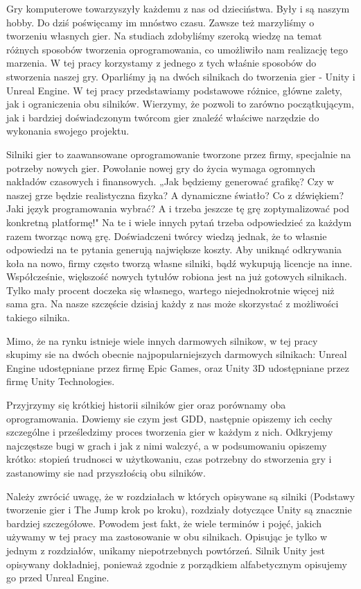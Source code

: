 \documentclass[openright]{xmgr}
\begin{document}
Gry komputerowe towarzyszyły każdemu z nas od dzieciństwa. Były i są naszym hobby. Do dziś poświęcamy im mnóstwo czasu. Zawsze też marzyliśmy o tworzeniu własnych gier. Na studiach zdobyliśmy szeroką wiedzę na temat różnych sposobów tworzenia oprogramowania, co umożliwiło nam realizację tego marzenia. W tej pracy korzystamy z jednego z tych właśnie sposobów do stworzenia naszej gry. Oparliśmy ją na dwóch silnikach do tworzenia gier - Unity i Unreal Engine. W tej pracy przedstawiamy podstawowe różnice, główne zalety, jak i ograniczenia obu silników. Wierzymy, że pozwoli to zarówno początkującym, jak i bardziej doświadczonym twórcom gier znaleźć właściwe narzędzie do wykonania swojego projektu.

Silniki gier to zaawansowane oprogramowanie tworzone przez firmy, specjalnie na potrzeby nowych gier. Powołanie nowej gry do życia wymaga ogromnych nakładów czasowych i finansowych. „Jak będziemy generować grafikę? Czy w naszej grze będzie realistyczna fizyka? A dynamiczne światło? Co z dźwiękiem? Jaki język programowania wybrać? A i trzeba jeszcze tę grę zoptymalizować pod konkretną platformę!" Na te i wiele innych pytań trzeba odpowiedzieć za każdym razem tworząc nową grę. Doświadczeni twórcy wiedzą jednak, że to własnie odpowiedzi na te pytania generują największe koszty. Aby uniknąć odkrywania koła na nowo, firmy często tworzą własne silniki, bądź wykupują licencje na inne. Współcześnie, większość nowych tytułów robiona jest na już gotowych silnikach. Tylko mały procent doczeka się własnego, wartego niejednokrotnie więcej niż sama gra. Na nasze szczęście dzisiaj każdy z nas może skorzystać z możliwości takiego silnika.

Mimo, że na rynku istnieje wiele innych darmowych silnikow, w tej pracy skupimy sie na dwóch obecnie najpopularniejszych darmowych silnikach:
Unreal Engine udostępniane przez firmę Epic Games, oraz Unity 3D udostępniane przez firmę Unity Technologies.

Przyjrzymy się krótkiej historii silników gier oraz porównamy oba oprogramowania. Dowiemy sie czym jest GDD, następnie opiszemy ich cechy szczególne i prześledzimy  proces tworzenia gier w każdym z nich. Odkryjemy najczęstsze bugi w grach i jak z nimi walczyć, a w podsumowaniu opiszemy krótko: stopień trudnosci w użytkowaniu, czas potrzebny do stworzenia gry i zastanowimy sie nad przyszłością obu silników.

Należy zwrócić uwagę, że w rozdziałach w których opisywane są silniki (Podstawy tworzenie gier i The Jump krok po kroku), rozdziały dotyczące Unity są znacznie bardziej szczegółowe. Powodem jest fakt, że wiele terminów i pojęć, jakich używamy w tej pracy ma zastosowanie w obu silnikach. Opisując je tylko w jednym z rozdziałów, unikamy niepotrzebnych powtórzeń. Silnik Unity jest opisywany dokładniej, ponieważ zgodnie z porządkiem alfabetycznym opisujemy go przed Unreal Engine.
\end{document}
